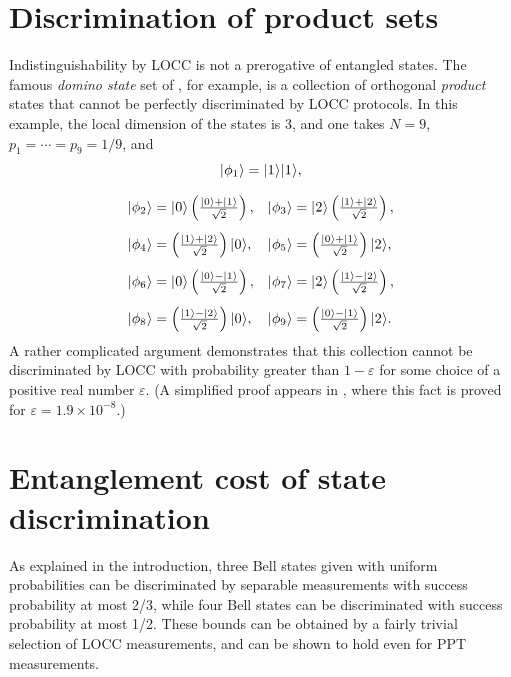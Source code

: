 \section{Discrimination of product sets}

Indistinguishability by LOCC is not a prerogative of entangled states. 
The famous \emph{domino state} set of \cite{Bennett99}, for example, is a 
collection of orthogonal \emph{product} states that cannot be perfectly 
discriminated by LOCC protocols.
In this example, the local dimension of the states is $3$, and one takes
$N = 9$, $p_1 = \cdots = p_9 = 1/9$, and
{\setlength{\arraycolsep}{2.5mm}%
\begin{equation} \label{eq:domino}
\begin{array}{ll}
  \multicolumn{2}{c}{\ket{\phi_1} = \ket{1}\ket{1},}\\[4mm]
  \ket{\phi_2} = \ket{0}\left(\frac{\ket{0} + \ket{1}}{\sqrt{2}}\right),
  & \ket{\phi_3} = \ket{2}\left(\frac{\ket{1} + \ket{2}}{\sqrt{2}}\right),
  \\[4mm]
  \ket{\phi_4} = \left(\frac{\ket{1} + \ket{2}}{\sqrt{2}}\right)\ket{0},
  & \ket{\phi_5} = \left(\frac{\ket{0} + \ket{1}}{\sqrt{2}}\right)\ket{2},
  \\[4mm]
  \ket{\phi_6} = \ket{0}\left(\frac{\ket{0} - \ket{1}}{\sqrt{2}}\right),
  & \ket{\phi_7} = \ket{2}\left(\frac{\ket{1} - \ket{2}}{\sqrt{2}}\right),
  \\[4mm]
  \ket{\phi_8} = \left(\frac{\ket{1} - \ket{2}}{\sqrt{2}}\right)\ket{0},
  & \ket{\phi_9} = \left(\frac{\ket{0} - \ket{1}}{\sqrt{2}}\right)\ket{2}.
\end{array}
\end{equation}
}%
A rather complicated argument demonstrates that this collection cannot be
discriminated by LOCC with probability greater than $1 - \varepsilon$ for some choice
of a positive real number $\varepsilon$.
(A simplified proof appears in \cite{Childs13}, where this fact
is proved for $\varepsilon = 1.9 \times 10^{-8}$.)



\section{Entanglement cost of state discrimination}

As explained in the introduction, three Bell states given with uniform
probabilities can be discriminated by separable measurements with success
probability at most 2/3, while four Bell states can be discriminated with success
probability at most 1/2.
These bounds can be obtained by a fairly trivial selection of LOCC
measurements, and can be shown to hold even for PPT measurements.

